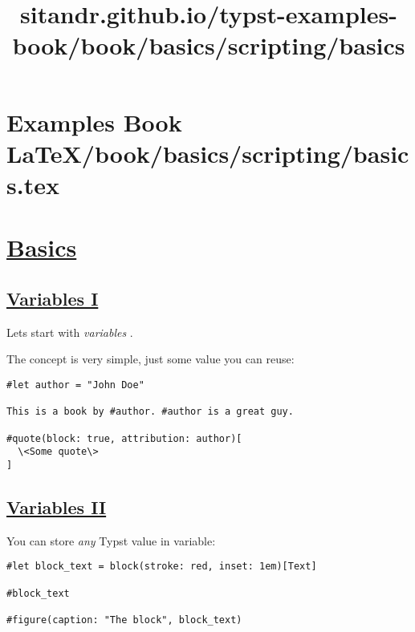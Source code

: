 \pandocbounded{}


\section{Examples Book LaTeX/book/basics/scripting/basics.tex}
\title{sitandr.github.io/typst-examples-book/book/basics/scripting/basics}

\section{\texorpdfstring{\hyperref[basics]{Basics}}{Basics}}\label{basics}

\subsection{\texorpdfstring{\hyperref[variables-i]{Variables
I}}{Variables I}}\label{variables-i}

Let\textquotesingle s start with \emph{variables} .

The concept is very simple, just some value you can reuse:

\begin{verbatim}
#let author = "John Doe"

This is a book by #author. #author is a great guy.

#quote(block: true, attribution: author)[
  \<Some quote\>
]
\end{verbatim}

\pandocbounded{}

\subsection{\texorpdfstring{\hyperref[variables-ii]{Variables
II}}{Variables II}}\label{variables-ii}

You can store \emph{any} Typst value in variable:

\begin{verbatim}
#let block_text = block(stroke: red, inset: 1em)[Text]

#block_text

#figure(caption: "The block", block_text)
\end{verbatim}

\pandocbounded{}

